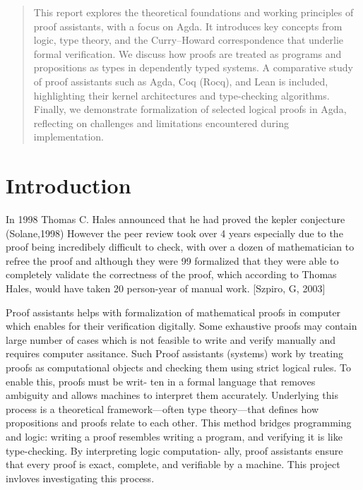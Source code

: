 \documentclass[12pt]{article}
\begin{document}
\clearpage

\begin{abstract}
This report explores the theoretical foundations and working principles of proof assistants, with a focus on Agda. It introduces key concepts from logic, type theory, and the Curry–Howard correspondence that underlie formal verification. We discuss how proofs are treated as programs and propositions as types in dependently typed systems. A comparative study of proof assistants such as Agda, Coq (Rocq), and Lean is included, highlighting their kernel architectures and type-checking algorithms. Finally, we demonstrate formalization of selected logical proofs in Agda, reflecting on challenges and limitations encountered during implementation.
\end{abstract}
\clearpage



\tableofcontents
\newpage

\section{Introduction}

In 1998 Thomas C. Hales announced that he had proved the kepler conjecture
(Solane,1998) However the peer review took over 4 years especially due to the proof
being incredibely difficult to check, with over a dozen of mathematician to refree
the proof and although they were 99%
formalized that they were able to completely validate the correctness of the proof,
which according to Thomas Hales, would have taken 20 person-year of manual work.
[Szpiro, G, 2003]

Proof assistants helps with formalization of mathematical proofs in computer which
enables for their verification digitally. Some exhaustive proofs may contain large
number of cases which is not feasible to write and verify manually and requires
computer assitance.
Such Proof assistants (systems) work by treating proofs as computational objects
and checking them using strict logical rules. To enable this, proofs must be writ-
ten in a formal language that removes ambiguity and allows machines to interpret
them accurately. Underlying this process is a theoretical framework—often type
theory—that defines how propositions and proofs relate to each other.
This method bridges programming and logic: writing a proof resembles writing a
program, and verifying it is like type-checking. By interpreting logic computation-
ally, proof assistants ensure that every proof is exact, complete, and verifiable by
a machine. This project invloves investigating this process. 
\end{document}
